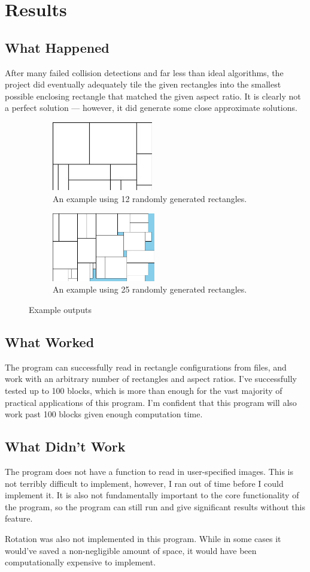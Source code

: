 \documentclass[10pt,titlepage,letterpaper]{article}
\begin{document}
	\section{Results}
	\subsection{What Happened}
	After many failed collision detections and far less than ideal algorithms, the project did eventually adequately tile the given rectangles into the smallest possible enclosing rectangle that matched the given aspect ratio. It is clearly not a perfect solution --- however, it did generate some close approximate solutions.
	\begin{figure}[ht]
		\centering
		\begin{subfigure}{0.40\textwidth}
			\centering
			\includegraphics[height=3cm]{img/12.jpg}
			\caption{An example using 12 randomly generated rectangles.}
		\end{subfigure}
		\begin{subfigure}{0.40\textwidth}
			\centering
			\includegraphics[height=3cm]{img/25.jpg}
			\caption{An example using 25 randomly generated rectangles.}
		\end{subfigure}
		\caption{Example outputs}
	\end{figure}
	\subsection{What Worked}
	The program can successfully read in rectangle configurations from files, and work with an arbitrary number of rectangles and aspect ratios. I've successfully tested up to 100 blocks, which is more than enough for the vast majority of practical applications of this program. I'm confident that this program will also work past 100 blocks given enough computation time.
	\subsection{What Didn't Work}
	The program does not have a function to read in user-specified images. This is not terribly difficult to implement, however, I ran out of time before I could implement it. It is also not fundamentally important to the core functionality of the program, so the program can still run and give significant results without this feature.\par
	Rotation was also not implemented in this program. While in some cases it would've saved a non-negligible amount of space, it would have been computationally expensive to implement.
\end{document}
